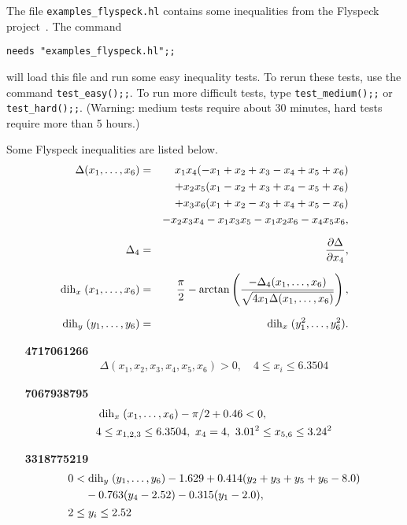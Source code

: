 \documentclass[a4paper]{article}
\newcommand{\partd}[2]{\frac{\partial #1}{\partial #2}}
\newcommand{\dih}{\mathrel{\rm dih}}
\begin{document}
The file \verb|examples_flyspeck.hl| contains some inequalities from the Flyspeck project~\cite{flyspeck}. The command

\verb|needs "examples_flyspeck.hl";;|

will load this file and run some easy inequality tests. To rerun these tests, use the command \verb|test_easy();;|. To run more difficult tests, type \verb|test_medium();;| or \verb|test_hard();;|.
(Warning: medium tests require about 30 minutes, hard tests require more than 5 hours.)

Some Flyspeck inequalities are listed below.
\begin{eqnarray*}
\Delta(x_1,\ldots,x_6) &= &x_1 x_4(-x_1 + x_2 + x_3 - x_4 + x_5 + x_6)\\
&& + x_2 x_5(x_1 - x_2 + x_3 + x_4 - x_5 + x_6)\\
&& + x_3 x_6(x_1 + x_2 - x_3 + x_4 + x_5 - x_6)\\
&& - x_2 x_3 x_4 - x_1 x_3 x_5 - x_1 x_2 x_6 - x_4 x_5 x_6,\\[6pt]
\Delta_4 &=& \partd{\Delta}{x_4},\\[6pt]
\dih_x(x_1,\ldots,x_6) &=& \frac{\pi}{2} - \arctan\left(\frac{-\Delta_4(x_1,\ldots,x_6)}{\sqrt{4 x_1 \Delta(x_1,\ldots,x_6)}}\right),\\[6pt]
\dih_y(y_1,\ldots,y_6) &=& \dih_x(y_1^2, \ldots, y_6^2).
\end{eqnarray*}

\begin{itemize}
\item[\bf 4717061266]
\begin{eqnarray*}
\Delta(x_1, x_2, x_3, x_4, x_5, x_6) > 0,\quad 4 \le x_i \le 6.3504
\end{eqnarray*}

\item[\bf 7067938795]
\begin{eqnarray*}
&\dih_x (x_1, \ldots, x_6) - \pi/2 + 0.46 < 0,\\
&4 \le x_{1,2,3} \le 6.3504,\ x_4 = 4,\ 3.01^2 \le x_{5,6} \le 3.24^2
\end{eqnarray*}

\item[\bf 3318775219]
\begin{eqnarray*}
&\begin{split}
0 < &\dih_y (y_1, \ldots, y_6) - 1.629 + 0.414 (y_2 + y_3 + y_5 + y_6 - 8.0)\\
	&- 0.763 (y_4 - 2.52) - 0.315 (y_1 - 2.0),
\end{split}\\
&2 \le y_i \le 2.52
\end{eqnarray*}

\end{itemize}
\end{document}
